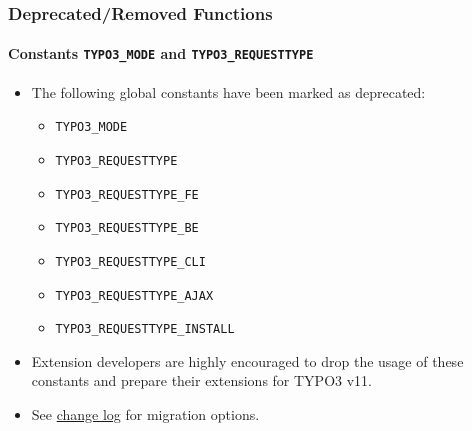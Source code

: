 %

\begin{frame}[fragile]
	\frametitle{Deprecated/Removed Functions}
	\framesubtitle{Constants \texttt{TYPO3\_MODE} and \texttt{TYPO3\_REQUESTTYPE}}

	\begin{itemize}
		\item The following global constants have been marked as deprecated:
			\begin{itemize}\smaller
				\item \texttt{TYPO3\_MODE}
				\item \texttt{TYPO3\_REQUESTTYPE}
				\item \texttt{TYPO3\_REQUESTTYPE\_FE}
				\item \texttt{TYPO3\_REQUESTTYPE\_BE}
				\item \texttt{TYPO3\_REQUESTTYPE\_CLI}
				\item \texttt{TYPO3\_REQUESTTYPE\_AJAX}
				\item \texttt{TYPO3\_REQUESTTYPE\_INSTALL}
			\end{itemize}\normalsize

		\item Extension developers are highly encouraged to drop the usage of
			these constants and prepare their extensions for TYPO3 v11.
		\item See \href{https://docs.typo3.org/c/typo3/cms-core/master/en-us/Changelog/11.0/Deprecation-92947-DeprecateTYPO3_MODEAndTYPO3_REQUESTTYPEConstants.html}{change log}
			for migration options.
	\end{itemize}

\end{frame}

